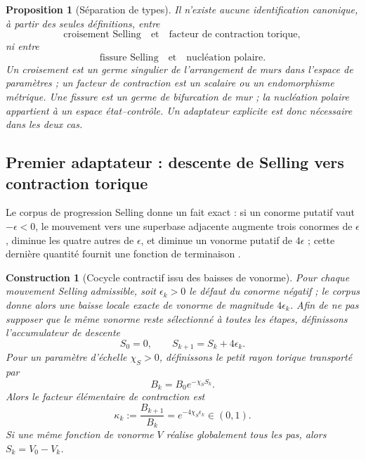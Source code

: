 \documentclass[11pt,a4paper]{article}
\newtheorem{proposition}[theorem]{Proposition}
\newtheorem{construction}[theorem]{Construction}
\begin{document}
\begin{proposition}[Séparation de types]\label{prop:selling-type-noauto}
Il n'existe aucune identification canonique, à partir des seules définitions, entre
\[
 \text{croisement Selling}\quad\text{et}\quad\text{facteur de contraction torique},
\]
ni entre
\[
 \text{fissure Selling}\quad\text{et}\quad\text{nucléation polaire}.
\]
Un croisement est un germe singulier de l'arrangement de murs dans l'espace de paramètres ; un facteur de contraction est un scalaire ou un endomorphisme métrique. Une fissure est un germe de bifurcation de mur ; la nucléation polaire appartient à un espace état--contrôle. Un adaptateur explicite est donc nécessaire dans les deux cas.
\end{proposition}

\subsection{Premier adaptateur : descente de Selling vers contraction torique}

Le corpus de progression Selling donne un fait exact : si un conorme putatif vaut $-\epsilon<0$, le mouvement vers une superbase adjacente augmente trois conormes de $\epsilon$, diminue les quatre autres de $\epsilon$, et diminue un vonorme putatif de $4\epsilon$ ; cette dernière quantité fournit une fonction de terminaison \cite{Selling43}.

\begin{construction}[Cocycle contractif issu des baisses de vonorme]\label{cons:selling-vonorm-contract}
Pour chaque mouvement Selling admissible, soit $\epsilon_k>0$ le défaut du conorme négatif ; le corpus donne alors une baisse locale exacte de vonorme de magnitude $4\epsilon_k$. Afin de ne pas supposer que le même vonorme reste sélectionné à toutes les étapes, définissons l'accumulateur de descente
\[
 S_0=0,
 \qquad
 S_{k+1}=S_k+4\epsilon_k.
\]
Pour un paramètre d'échelle $\chi_S>0$, définissons le petit rayon torique transporté par
\begin{equation}\label{eq:bsell}
 B_k=B_0e^{-\chi_SS_k}.
\end{equation}
Alors le facteur élémentaire de contraction est
\begin{equation}\label{eq:kappasell}
 \boxed{\kappa_k:=\frac{B_{k+1}}{B_k}=e^{-4\chi_S\epsilon_k}\in(0,1).}
\end{equation}
Si une même fonction de vonorme $V$ réalise globalement tous les pas, alors $S_k=V_0-V_k$.
\end{construction}
\end{document}
